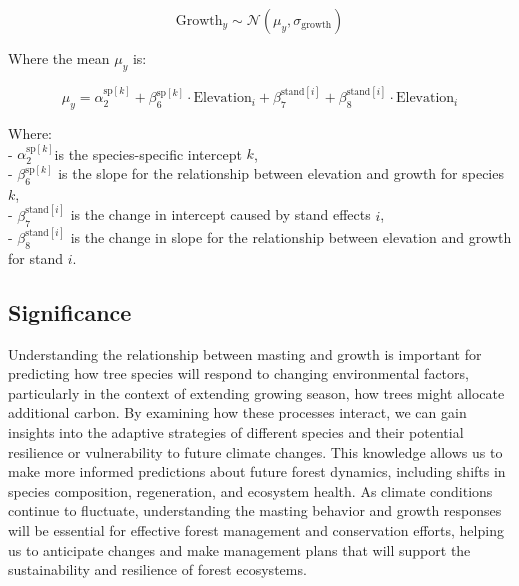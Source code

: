 \documentclass[11pt,letter]{article}
\begin{document}
\[
\text{Growth}_y \sim \mathcal{N}(\mu_y, \sigma_{\text{growth}})
\]

Where the mean \(\mu_y\) is:

\[
\mu_y = \alpha_2^{\text{sp}[k]} + \beta_6^{\text{sp}[k]} \cdot \text{Elevation}_i + \beta_7^{\text{stand}[i]} + \beta_8^{\text{stand}[i]} \cdot \text{Elevation}_i
\]

Where:\\
- \(\alpha_2^{\text{sp}[k]}\)is the species-specific intercept \(k\),\\
- \(\beta_6^{\text{sp}[k]}\) is the slope for the relationship between elevation and growth for species \(k\),\\
- \(\beta_7^{\text{stand}[i]}\) is the change in intercept caused by stand effects \(i\),\\
- \(\beta_8^{\text{stand}[i]}\) is the change in slope for the relationship between elevation and growth for stand \(i\).


\subsection{Significance}
Understanding the relationship between masting and growth is important for predicting how tree species will respond to changing environmental factors, particularly in the context of extending growing season, how trees might allocate additional carbon. By examining how these processes interact, we can gain insights into the adaptive strategies of different species and their potential resilience or vulnerability to future climate changes. This knowledge allows us to make more informed predictions about future forest dynamics, including shifts in species composition, regeneration, and ecosystem health. As climate conditions continue to fluctuate, understanding the  masting behavior and growth responses will be essential for effective forest management and conservation efforts, helping us to anticipate changes and make management plans that will support the sustainability and resilience of forest ecosystems.\par
\end{document}
